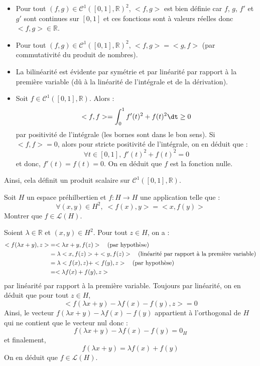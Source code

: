 \documentclass[a4paper,10pt]{report}
\begin{document}
\corr 

\begin{itemize}
\item Pour tout $(f,g) \in \mathcal{C}^1([0,1],\mathbb{R})^2$, $<f,g>$ est bien définie car $f$, $g$, $f'$ et $g'$ sont continues sur $[0,1]$ et ces fonctions sont à valeurs réelles donc $<f,g> \in \mathbb{R}$.
\item Pour tout $(f,g) \in \mathcal{C}^1([0,1],\mathbb{R})^2$, $<f,g>= <g,f>$ (par commutativité du produit de nombres).
\item La bilinéarité est évidente par symétrie et par linéarité par rapport à la première variable (dû à la linéarité de l'intégrale et de la dérivation).
\item Soit $f \in \mathcal{C}^1([0,1],\mathbb{R})$. Alors :
$$ <f,f> =\int_0^1 f'(t)^2+f(t)^2 \dt \geq 0$$
par positivité de l'intégrale (les bornes sont dans le bon sens). Si $<f,f>=0$, alors pour stricte positivité de l'intégrale, on en déduit que :
$$ \forall t \in [0,1], \, f'(t)^2+f(t)^2=0$$
et donc, $f'(t)=f(t)=0$. On en déduit que $f$ est la fonction nulle. 
\end{itemize}
Ainsi, cela définit un produit scalaire sur $\mathcal{C}^1([0,1],\mathbb{R})$.

\begin{Exa} Soit $H$ un espace préhilbertien et $f : H \rightarrow H$ une application telle que :
$$ \forall (x,y) \in H^2, \; <f(x),y>=<x,f(y)>$$
Montrer que $f \in \mathcal{L}(H)$.
\end{Exa} 

\corr Soient $\lambda \in \mathbb{R}$ et $(x,y) \in H^2$. Pour tout $z \in H$, on a :
\begin{align*}
<f(\lambda x +y),z> & = <\lambda x+y, f(z)> \quad \hbox{(par hypothèse)} \\
& = \lambda <x,f(z)> + <y,f(z)> \quad \hbox{(linéarité par rapport à la première variable)} \\
& = \lambda <f(x),z) + <f(y),z>  \quad \hbox{(par hypothèse)} \\
& = <\lambda f(x)+f(y), z> 
\end{align*}
par linéarité par rapport à la première variable. Toujours par linéarité, on en déduit que pour tout $z \in H$,
$$ <f(\lambda x +y)-\lambda f(x)-f(y), z> =0$$
Ainsi, le vecteur $f(\lambda x +y)-\lambda f(x)-f(y)$ appartient à l'orthogonal de $H$ qui ne contient que le vecteur nul donc :
$$ f(\lambda x +y)-\lambda f(x)-f(y) = 0_H$$
et finalement,
$$ f(\lambda x +y)= \lambda f(x)+f(y)$$
On en déduit que $f \in \mathcal{L}(H)$.
\end{document}
